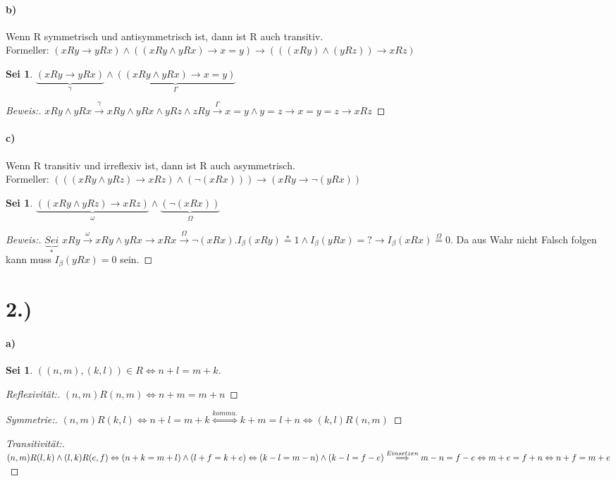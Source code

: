 \documentclass[titlepage]{article}
\theoremstyle{plain}
\newtheorem{theorem2}{Sei}
\newtheorem{theorem3}{Sei}
\newtheorem*{theorem4}{Sei}
\newcommand{\1}{\mathbb{1}}
\newcommand{\0}{\mathbb{0}}
\begin{document}
		\paragraph{b)}Wenn R symmetrisch und antisymmetrisch ist, dann ist R auch transitiv. \\ Formeller: $(xRy\rightarrow yRx)\land((xRy\land yRx)\rightarrow x=y)\rightarrow(((xRy)\land(yRz))\rightarrow xRz)$
		\begin{theorem2}
			$\underbrace{(xRy\rightarrow yRx)}_{\gamma}\land\underbrace{((xRy\land yRx)\rightarrow x=y)}_{\varGamma}$
		\end{theorem2}
		\begin{proof}[Beweis:]
			$xRy\land yRx\overset{\gamma}{\rightarrow}xRy\land yRx\land yRz\land zRy\overset{\varGamma}{\rightarrow}x=y\land y=z\rightarrow x=y=z\rightarrow xRz$
		\end{proof}
		\paragraph{c)}Wenn R transitiv und irreflexiv ist, dann ist R auch asymmetrisch.
		\\ Formeller: $(((xRy\land yRz)\rightarrow xRz)\land(\lnot(xRx)))\rightarrow(xRy\rightarrow\lnot(yRx))$
		\begin{theorem3}
			$\underbrace{((xRy\land yRz)\rightarrow xRz)}_{\omega}\land\underbrace{(\lnot(xRx))}_{\varOmega}$
		\end{theorem3}
		\begin{proof}[Beweis:]
			$\underbrace{Sei}_*$ $xRy\overset{\omega}{\rightarrow}xRy\land yRx\rightarrow xRx\overset{\varOmega}{\rightarrow}\lnot(xRx). I_{\beta}(xRy)\overset{*}{=}1\land I_{\beta}(yRx)=?\rightarrow I_{\beta}(xRx)\overset{\varOmega}{=}0$. Da aus Wahr nicht Falsch folgen kann muss $I_{\beta}(yRx)=0$ sein.
		\end{proof}
	\section*{2.)}
		\paragraph{a)}
		\begin{theorem4}
			$((n,m),(k,l))\in R\Leftrightarrow n+l=m+k.$
		\end{theorem4}
		\begin{proof}[Reflexivität:]
			$(n,m)R(n,m)\Leftrightarrow n+m=m+n$
		\end{proof}
		\begin{proof}[Symmetrie:]
			$(n,m)R(k,l)\Leftrightarrow n+l=m+k\overset{kommu.}{\Longleftrightarrow} k+m=l+n\Leftrightarrow(k,l)R(n,m)$
		\end{proof}
		\begin{proof}[Transitivität:]
			$(n,m)R(l,k)\land(l,k)R(e,f)\Leftrightarrow (n+k=m+l)\land(l+f=k+e)\\\Leftrightarrow(k-l=m-n)\land(k-l=f-e)\overset{Einsetzen}{\Longrightarrow}m-n=f-e\Leftrightarrow m+e=f+n\Leftrightarrow n+f=m+e$
		\end{proof}
\end{document}
